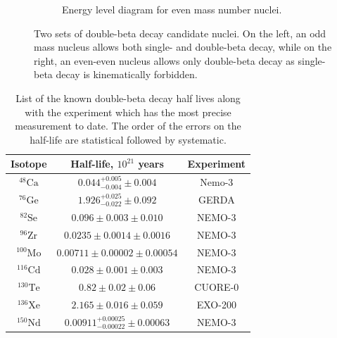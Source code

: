 \begin{figure}[htbp]
\begin{subfigure}[t]{0.40\textwidth}
\caption[[Energy level diagram for even mass number nuclei.]{Energy level diagram for even mass number nuclei.}
\end{subfigure}
\caption[Two sets of double-beta decay candidate nuclei. On the left, an odd mass nucleus allows both single- and double-beta decay, while on the right, an even-even nucleus allows only double-beta decay as single-beta decay is kinematically forbidden.]{Two sets of double-beta decay candidate nuclei. On the left, an odd mass nucleus allows both single- and double-beta decay, while on the right, an even-even nucleus allows only double-beta decay as single-beta decay is kinematically forbidden.}
\label{fig:parabola_even}
\end{figure}

\begin{table}[htpb]
\centering
\begin{tabular}{|c|c|c|}
\hline
Isotope & Half-life, $10^{21}$ years & Experiment \\ \hline 
$^{48}\textrm{Ca}$ & $0.044^{+0.005}_{-0.004} \pm 0.004$ & Nemo-3 \cite{Bongrand:2011ei} \\ \hline
$^{76}\textrm{Ge}$ & $1.926^{+0.025}_{-0.022} \pm 0.092$ & GERDA \cite{Agostini:2015nwa} \\ \hline
$^{82}\textrm{Se}$ & $0.096 \pm 0.003 \pm 0.010$ & NEMO-3 \cite{Bongrand:2011ei}\\ \hline
$^{96}\textrm{Zr}$ & $0.0235 \pm 0.0014 \pm 0.0016$ & NEMO-3 \cite{Bongrand:2011ei}\\ \hline
$^{100}\textrm{Mo}$ & $0.00711 \pm 0.00002 \pm 0.00054$ & NEMO-3 \cite{Bongrand:2011ei}\\ \hline
$^{116}\textrm{Cd}$ & $0.028 \pm 0.001 \pm 0.003$ & NEMO-3 \cite{Bongrand:2011ei} \\ \hline
$^{130}\textrm{Te}$ & $0.82 \pm 0.02\pm 0.06$ & CUORE-0 \cite{Alduino:2016vtd} \\ \hline
$^{136}\textrm{Xe}$ & $2.165 \pm 0.016 \pm 0.059$ & EXO-200 \cite{Albert:2013gpz} \\ \hline
$^{150}\textrm{Nd}$ & $0.00911^{+0.00025}_{-0.00022}\pm 0.00063$ & NEMO-3 \cite{Bongrand:2011ei} \\ \hline
\end{tabular} 
\caption[List of known two-neutrino beta decay half lives.]{List of the known double-beta decay half lives along with the experiment which has the most precise measurement to date. The order of the errors on the half-life are statistical followed by systematic.}
\label{tab:2nuHalfLife}
\end{table}

